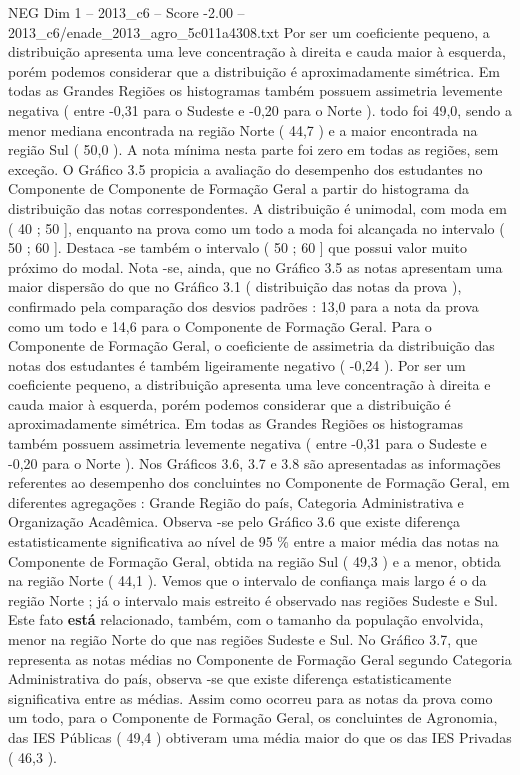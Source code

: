 \begin{textsample}{NEG Dim 1 – 2013\_c6 – Score -2.00 – 2013\_c6/enade\_2013\_agro\_5c011a4308.txt}
Por ser um coeficiente pequeno, a distribuição apresenta uma leve concentração à direita e cauda maior à esquerda, porém podemos considerar que a distribuição é aproximadamente simétrica.
Em todas as Grandes Regiões os histogramas também possuem assimetria levemente negativa ( entre -0,31 para o Sudeste e -0,20 para o Norte ). todo foi 49,0, sendo a menor mediana encontrada na região Norte ( 44,7 ) e a maior encontrada na região Sul ( 50,0 ).
A nota mínima nesta parte foi zero em todas as regiões, sem exceção.
O Gráfico 3.5 propicia a avaliação do desempenho dos estudantes no Componente de Componente de Formação Geral a partir do histograma da distribuição das notas correspondentes.
A distribuição é unimodal, com moda em ( 40 ; 50 ], enquanto na prova como um todo a moda foi alcançada no intervalo ( 50 ; 60 ].
Destaca -se também o intervalo ( 50 ; 60 ] que possui valor muito próximo do modal.
Nota -se, ainda, que no Gráfico 3.5 as notas apresentam uma maior dispersão do que no Gráfico 3.1 ( distribuição das notas da prova ), confirmado pela comparação dos desvios padrões : 13,0 para a nota da prova como um todo e 14,6 para o Componente de Formação Geral.
Para o Componente de Formação Geral, o coeficiente de assimetria da distribuição das notas dos estudantes é também ligeiramente negativo ( -0,24 ).
Por ser um coeficiente pequeno, a distribuição apresenta uma leve concentração à direita e cauda maior à esquerda, porém podemos considerar que a distribuição é aproximadamente simétrica.
Em todas as Grandes Regiões os histogramas também possuem assimetria levemente negativa ( entre -0,31 para o Sudeste e -0,20 para o Norte ).
Nos Gráficos 3.6, 3.7 e 3.8 são apresentadas as informações referentes ao desempenho dos concluintes no Componente de Formação Geral, em diferentes agregações : Grande Região do país, Categoria Administrativa e Organização Acadêmica.
Observa -se pelo Gráfico 3.6 que existe diferença estatisticamente significativa ao nível de 95 \% entre a maior média das notas na Componente de Formação Geral, obtida na região Sul ( 49,3 ) e a menor, obtida na região Norte ( 44,1 ).
Vemos que o intervalo de confiança mais largo é o da região Norte ; já o intervalo mais estreito é observado nas regiões Sudeste e Sul.
Este fato \textbf{está} relacionado, também, com o tamanho da população envolvida, menor na região Norte do que nas regiões Sudeste e Sul.
No Gráfico 3.7, que representa as notas médias no Componente de Formação Geral segundo Categoria Administrativa do país, observa -se que existe diferença estatisticamente significativa entre as médias.
Assim como ocorreu para as notas da prova como um todo, para o Componente de Formação Geral, os concluintes de Agronomia, das IES Públicas ( 49,4 ) obtiveram uma média maior do que os das IES Privadas ( 46,3 ).

\end{textsample}
